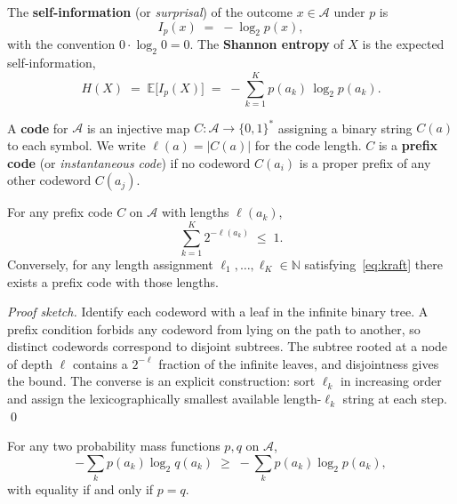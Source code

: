 \begin{definition}
\label{def:entropy}
The \textbf{self-information} (or \emph{surprisal}) of the outcome $x \in
\mathcal{A}$ under $p$ is
\begin{equation}
  I_p(x) \;=\; -\log_2 p(x), \label{eq:self-info}
\end{equation}
with the convention $0 \cdot \log_2 0 = 0$. The \textbf{Shannon entropy}
of $X$ is the expected self-information,
\begin{equation}
  H(X) \;=\; \mathbb{E}\bigl[I_p(X)\bigr]
       \;=\; -\sum_{k=1}^{K} p(a_k)\,\log_2 p(a_k). \label{eq:entropy}
\end{equation}
\end{definition}

A \textbf{code} for $\mathcal{A}$ is an injective map
$C : \mathcal{A} \to \{0,1\}^*$ assigning a binary string $C(a)$ to each
symbol. We write $\ell(a) = |C(a)|$ for the code length. $C$ is a
\textbf{prefix code} (or \emph{instantaneous code}) if no codeword
$C(a_i)$ is a proper prefix of any other codeword $C(a_j)$.

\begin{lemma}
\label{lem:kraft}
For any prefix code $C$ on $\mathcal{A}$ with lengths $\ell(a_k)$,
\begin{equation}
  \sum_{k=1}^{K} 2^{-\ell(a_k)} \;\le\; 1. \label{eq:kraft}
\end{equation}
Conversely, for any length assignment $\ell_1, \dots, \ell_K \in
\mathbb{N}$ satisfying~\eqref{eq:kraft} there exists a prefix code with
those lengths.
\end{lemma}

\emph{Proof sketch.} Identify each codeword with a leaf in the infinite
binary tree. A prefix condition forbids any codeword from lying on the
path to another, so distinct codewords correspond to disjoint subtrees.
The subtree rooted at a node of depth $\ell$ contains a $2^{-\ell}$
fraction of the infinite leaves, and disjointness gives the bound.
The converse is an explicit construction: sort $\ell_k$ in increasing
order and assign the lexicographically smallest available
length-$\ell_k$ string at each step. \qed

\begin{lemma}
\label{lem:gibbs}
For any two probability mass functions $p, q$ on $\mathcal{A}$,
\begin{equation}
  -\sum_{k} p(a_k) \log_2 q(a_k)
    \;\ge\; -\sum_{k} p(a_k) \log_2 p(a_k), \label{eq:gibbs}
\end{equation}
with equality if and only if $p = q$.
\end{lemma}

